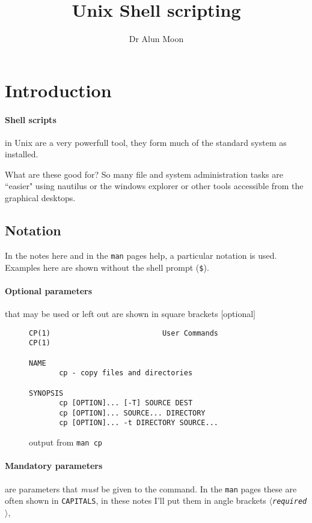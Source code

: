 \documentclass{article}
\title{Unix Shell scripting}
\author{Dr Alun Moon}
\begin{document}
\maketitle
\section{Introduction}
\paragraph{Shell scripts} in Unix are a very powerfull tool, they
form much of the standard system as installed.

What are these good for? So many file and system administration tasks
are ``easier" using nautilus or the windows explorer or other tools
accessible from the graphical desktops.

\subsection{Notation}
In the notes here and in the \texttt{man} pages help, a particular
notation is used.  Examples here are shown without the shell prompt
(\texttt{\$}).

\paragraph{Optional parameters} that may be used or left out are
shown in square brackets $[$optional$]$
\begin{figure*}[h]
\begin{verbatim}
CP(1)                          User Commands                          CP(1)

NAME
       cp - copy files and directories

SYNOPSIS
       cp [OPTION]... [-T] SOURCE DEST
       cp [OPTION]... SOURCE... DIRECTORY
       cp [OPTION]... -t DIRECTORY SOURCE...
\end{verbatim}
  \caption{output from \texttt{man cp}}
\end{figure*}

\paragraph{Mandatory parameters} are parameters that \emph{must} be
given to the command.  In the \texttt{man} pages these are often shown
in \texttt{CAPITALS}, in these notes I'll put them  in angle
brackets $\langle$\texttt{\emph{required}}$\rangle$,
\end{document}
